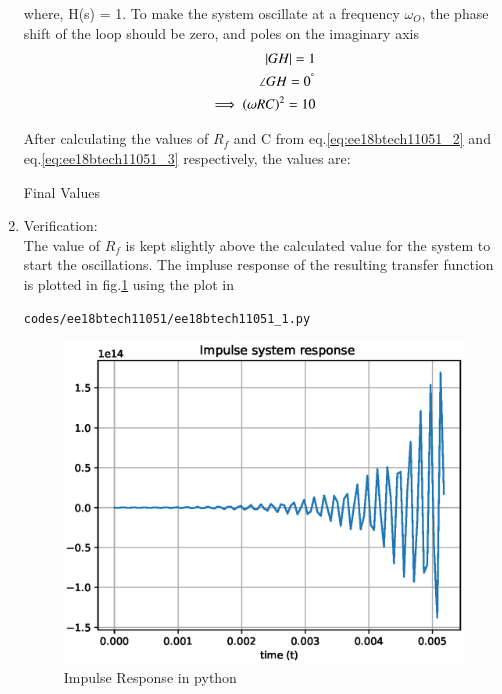 \begin{enumerate}[label=\arabic*.,ref=\theenumi]
where, H(s) = 1. To make the system oscillate at a frequency $\omega_{O}$, the phase shift of the loop should be zero, and poles on the imaginary axis
\begin{align}
    |GH|=1\\ \angle GH = 0^{\degree} \\
    \implies (\omega RC)^{2} = 10 \label{eq:ee18btech11051_3}
\end{align}

After calculating the values of $R_{f}$ and C from eq.\ref{eq:ee18btech11051_2} and eq.\ref{eq:ee18btech11051_3} respectively, the values are:
\begin{table}[!ht]
    \centering
    
    \caption{Final Values}
    \label{table:ee18btech11051_table_1}
\end{table}

\item
Verification:\\
The value of $R_{f}$ is kept slightly above the calculated value for the system to start the oscillations. The impluse response of the resulting transfer function is plotted in fig.\ref{fig:ee18btech11051_plot1} using the plot in 
\begin{lstlisting}
codes/ee18btech11051/ee18btech11051_1.py
\end{lstlisting}

\begin{figure}[!ht]
\centering
\includegraphics[width=\columnwidth]{./figs/ee18btech11051/ee18btech11051_plot1.eps}
\caption{Impulse Response in python}
\label{fig:ee18btech11051_plot1}
\end{figure}


\end{enumerate}

